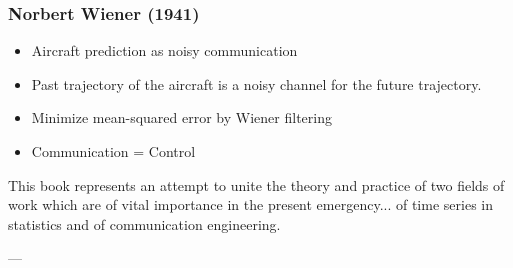 \documentclass{beamer}
\begin{document}
\begin{frame}
\frametitle{Norbert Wiener (1941)}
\begin{itemize}
    \item Aircraft prediction as noisy communication
    \item Past trajectory of the aircraft is a noisy channel for the future trajectory.
    \item Minimize mean-squared error by Wiener filtering
    \item Communication = Control
\end{itemize}
\begin{displayquote}
    This book represents an attempt to unite the theory and practice of two fields of work which are of vital importance in the present emergency... of time series in statistics and of communication engineering.

    --- \cite[page 1]{norbertwienerExtrapolationInterpolationSmoothing1966}
\end{displayquote}

\end{frame}
\end{document}

